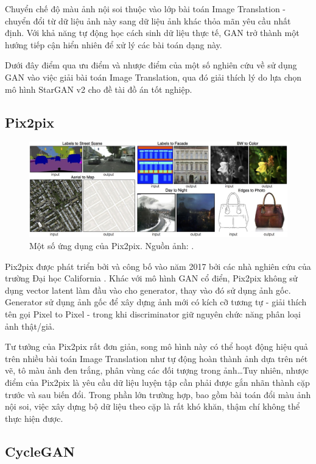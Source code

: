 \documentclass[12pt]{extreport}
\begin{document}
Chuyển chế độ màu ảnh nội soi thuộc vào lớp bài toán Image Translation - chuyển đổi từ dữ liệu ảnh này sang dữ liệu ảnh khác thỏa mãn yêu cầu nhất định. Với khả năng tự động học cách sinh dữ liệu thực tế, GAN trở thành một hướng tiếp cận hiển nhiên để xử lý các bài toán dạng này.

Dưới đây điểm qua ưu điểm và nhược điểm của một số nghiên cứu về sử dụng GAN vào việc giải bài toán Image Translation, qua đó giải thích lý do lựa chọn mô hình StarGAN v2 cho đề tài đồ án tốt nghiệp.

\subsection{Pix2pix}

\begin{figure}[H]
    \centering
    \includegraphics[width=\textwidth]{figure14}
    \caption{Một số ứng dụng của Pix2pix. Nguồn ảnh: \cite{pix2pix2017}.}
\end{figure}

Pix2pix được phát triển bởi và công bố vào năm 2017 bởi các nhà nghiên cứu của trường Đại học California \cite{pix2pix2017}. Khác với mô hình GAN cổ điển, Pix2pix không sử dụng vector latent làm đầu vào cho generator, thay vào đó sử dụng ảnh gốc. Generator sử dụng ảnh gốc để xây dựng ảnh mới có kích cỡ tương tự - giải thích tên gọi Pixel to Pixel - trong khi discriminator giữ nguyên chức năng phân loại ảnh thật/giả.

Tư tưởng của Pix2pix rất đơn giản, song mô hình này có thể hoạt động hiệu quả trên nhiều bài toán Image Translation như tự động hoàn thành ảnh dựa trên nét vẽ, tô màu ảnh đen trắng, phân vùng các đối tượng trong ảnh\dots Tuy nhiên, nhược điểm của Pix2pix là yêu cầu dữ liệu luyện tập cần phải được gắn nhãn thành cặp trước và sau biến đổi. Trong phần lớn trường hợp, bao gồm bài toán đổi màu ảnh nội soi, việc xây dựng bộ dữ liệu theo cặp là rất khó khăn, thậm chí không thể thực hiện được.

\subsection{CycleGAN}
\end{document}
